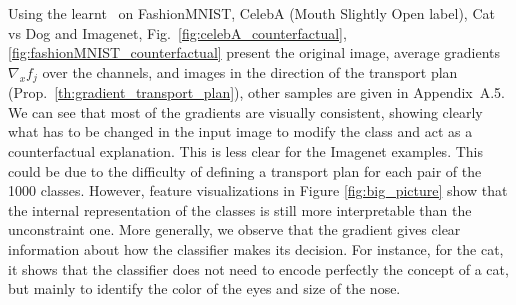Using the learnt \otnn~on FashionMNIST, CelebA (Mouth Slightly Open label), Cat vs Dog and Imagenet, Fig.~\ref{fig:celebA_counterfactual},\ref{fig:fashionMNIST_counterfactual}  present the original image, average gradients $\nabla_x f_j$  over the channels, and images in the direction of the transport plan (Prop.~\ref{th:gradient_transport_plan}), other samples are given in Appendix~A.5. 
We can see that most of the gradients are visually consistent, showing clearly what has to be changed in the input image to modify the class and act as a counterfactual explanation. 
This is less clear for the Imagenet examples. This could be due to the difficulty of defining a transport plan for each pair of the 1000 classes. However, feature visualizations in Figure \ref{fig:big_picture} show that the internal representation of the classes is still more interpretable than the unconstraint one. 
More generally, we observe that the gradient gives clear information about how the classifier makes its decision. For instance, for the cat, it shows that the classifier does not need to encode perfectly the concept of a cat, but mainly to identify the color of the eyes and size of the nose.

